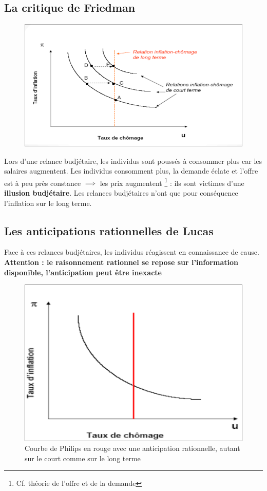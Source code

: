 \subsection{La critique de Friedman}
\begin{figure}[hbt!]
    \includegraphics[scale = 0.4]{Pics/Critique_Friedman.png}
\end{figure}
Lors d'une relance budjétaire, les individus sont poussés à consommer plus car les salaires augmentent. Les individus consomment plus, la demande éclate et l'offre est à peu près constance $\implies$ les prix augmentent \footnote{Cf. théorie de l'offre et de la demande} : ils sont victimes d'une \textbf{illusion budjétaire}. Les relances budjétaires n'ont que pour conséquence l'inflation sur le long terme.
\subsection{Les anticipations rationnelles de Lucas}
Face à ces relances budjétaires, les individus réagissent en connaissance de cause. \textbf{Attention : le raisonnement rationnel se repose sur l'information disponible, l'anticipation peut être inexacte} 
\newpage
\begin{figure}[hbt!]
    \centering
    \includegraphics[scale=0.5]{Pics/anticipation_rationnelle_philips.png}
    \caption{Courbe de Philips \textcolor{BrickRed}{en rouge} avec une anticipation rationnelle, autant sur le court comme sur le long terme}
\end{figure}
